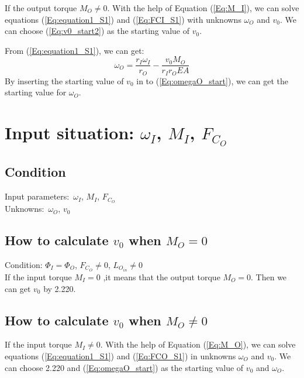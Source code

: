 \documentclass[a4paper,fleqn,13pt]{article}
\begin{document}
If the output torque $M_O \neq 0$. With the help of Equation (\ref{Eq:M_I}), we can solve equations (\ref{Eq:equation1_S1}) and (\ref{Eq:FCI_S1}) with unknowns $\omega_O$ and $v_0$.
We can choose (\ref{Eq:v0_start2}) as the starting value of $v_0$.

From (\ref{Eq:equation1_S1}), we can get:
\begin{equation} \label{Eq:omegaO_start}
  \omega_O =\frac{r_I \omega_I}{r_O} - \frac{v_0 M_O}{r_I r_O E A}
\end{equation}
By inserting the starting value of $v_0$ in to (\ref{Eq:omegaO_start}), we can get the starting value for $\omega_O$.




\section{Input situation: $\omega_I$, $M_I$, $F_{C_O}$}

\subsection{Condition}
Input parameters:\ $\omega_I$, $M_I$, $F_{C_O}$ \\
Unknowns:\ $\omega_O$, $v_0$

\subsection{How to calculate $v_0$ when $M_O = 0$}
Condition: $\Phi_I=\Phi_O$, $F_{C_O} \not = 0$, $L_{O_{in}} \neq 0$  \\

If the input torque $M_I = 0$ ,it means that the output torque $M_O = 0$. Then we can get $v_0$ by 2.220.

\subsection{How to calculate $v_0$ when $M_O \not = 0$ }
If the input torque $M_I \neq 0$. With the help of Equation (\ref{Eq:M_O}), we can solve equations (\ref{Eq:equation1_S1}) and (\ref{Eq:FCO_S1}) in unknowns $\omega_O$ and $v_0$.
We can choose 2.220 and (\ref{Eq:omegaO_start}) as the starting value of $v_0$ and $\omega_O$.




\end{document}
